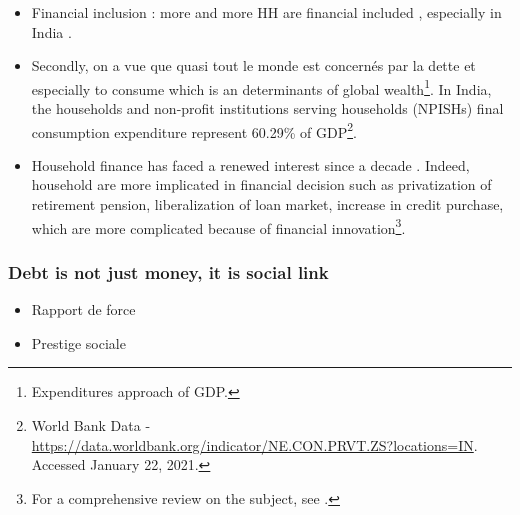 \documentclass[a4paper, 11pt, onecolumn]{article}
\begin{document}
\begin{itemize}
\item Financial inclusion : more and more HH are financial included \citep{Badarinza2019}, especially in India \citep{Chakravartya2013}. 
\item Secondly, on a vue que quasi tout le monde est concernés par la dette et especially to consume which is an determinants of global wealth\footnote{Expenditures approach of GDP.}.
In India, the households and non-profit institutions serving households (NPISHs) final consumption expenditure represent 60.29\% of GDP\footnote{World Bank Data - \url{https://data.worldbank.org/indicator/NE.CON.PRVT.ZS?locations=IN}. Accessed January 22, 2021.}.
\item Household finance has faced a renewed interest since a decade \citep{Guiso2013}.
Indeed, household are more implicated in financial decision such as privatization of retirement pension, liberalization of loan market, increase in credit purchase, which are more complicated because of financial innovation\footnote{For a comprehensive review on the subject, see \cite{Tufano2003}.}.
\end{itemize}





		\subsubsection{Debt is not just money, it is social link}
\begin{itemize}
\item Rapport de force
\item Prestige sociale
\end{itemize}
\end{document}

